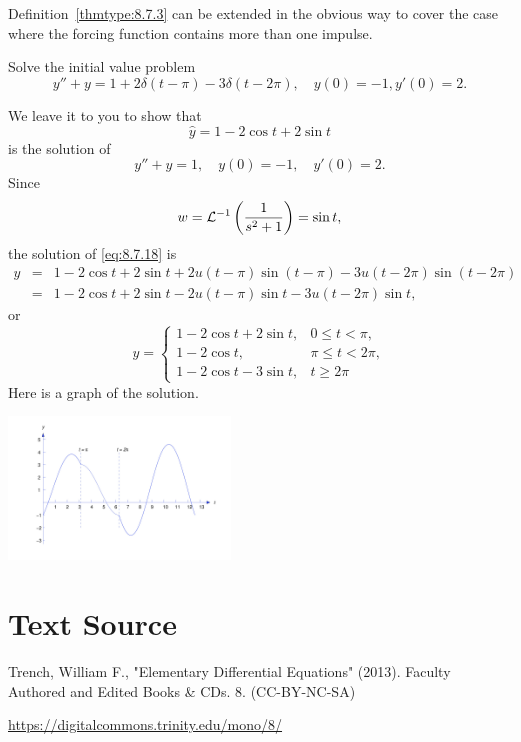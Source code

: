 \documentclass{ximera}
\begin{document}
Definition~\ref{thmtype:8.7.3} can be extended in the obvious way to cover
the case where the forcing function contains more than one impulse.
\begin{example}\label{example:8.7.3}
Solve the  initial value problem
\begin{equation} \label{eq:8.7.18}
y''+y=1+2\delta(t-\pi)-3\delta(t-2\pi), \quad    y(0)=-1,   y'(0)=2.
\end{equation}
\begin{explanation}
We leave it to you to show that
$$
\hat y= 1-2\cos t+2\sin t
$$
is the solution of
$$
y''+y=1, \quad    y(0)=-1,\quad    y'(0)=2.
$$
Since
$$
w={\cal L}^{-1}\left(\frac{1}{s^2+1}\right)=\sin t,
$$
the solution of  \eqref{eq:8.7.18} is
\begin{eqnarray*}
y&=&1-2\cos t+2\sin t+2u(t-\pi)\sin(t-\pi)-3u(t-2\pi)\sin(t-2\pi)\\
&=&1-2\cos t+2\sin t-2u(t-\pi)\sin t-3u(t-2\pi)\sin t,
\end{eqnarray*}
or
\begin{equation} \label{eq:8.7.19}
y=\left\{\begin{array}{cl} 1-2\cos t+2\sin t,&0\leq t<\pi,\\
1-2\cos t,&\pi\leq t<2\pi,\\
1-2\cos t-3\sin t,&t\geq 2\pi\end{array}\right.
\end{equation}
Here is a graph of the solution.
\begin{image}
 \includegraphics[height=1.5in]{fig080705.jpg}
\end{image}
\end{explanation}
\end{example}


\section*{Text Source}
Trench, William F., "Elementary Differential Equations" (2013). Faculty Authored and Edited Books \& CDs. 8. (CC-BY-NC-SA)

\href{https://digitalcommons.trinity.edu/mono/8/}{https://digitalcommons.trinity.edu/mono/8/}
\end{document}
